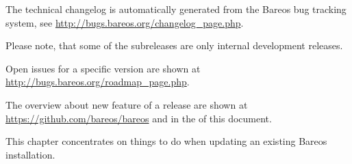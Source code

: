 \label{releasenotes}

The technical changelog is automatically generated from the Bareos bug tracking system, see \url{http://bugs.bareos.org/changelog_page.php}.

Please note, that some of the subreleases are only internal development releases.

Open issues for a specific version are shown at
\url{http://bugs.bareos.org/roadmap_page.php}.

The overview about new feature of a release are shown at
\url{https://github.com/bareos/bareos} and in the  of this document.

This chapter concentrates on things to do when updating an existing Bareos installation.



